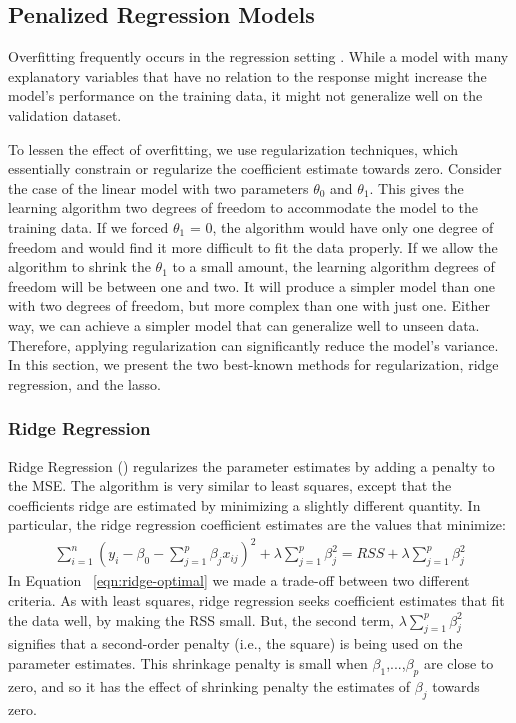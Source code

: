 \subsection{Penalized Regression Models}
\label{ssec:penalized_regression_models}

Overfitting frequently occurs in the regression setting
\parencite{harrell2015regression}.  While a model with many explanatory
variables that have no relation to the response might increase the model's
performance on the training data, it might not generalize well on the validation dataset.

To lessen the effect of overfitting, we use regularization techniques, which
essentially constrain or regularize the coefficient estimate towards zero.
Consider the case of the linear model with two parameters $\theta_0$ and
$\theta_1$. This gives the learning algorithm two degrees of freedom to
accommodate the model to the training data. If we forced $\theta_1$ = 0, the
algorithm would have only one degree of freedom and would find it more difficult
to fit the data properly. If we allow the algorithm to shrink the $\theta_1$  to
a small amount, the learning algorithm degrees of freedom will be between one
and two. It will produce a simpler model than one with two degrees of freedom,
but more complex than one with just one.  Either way, we can achieve a simpler
model that can generalize well to unseen data. Therefore, applying regularization can significantly reduce the model's variance.
In this section, we present the two best-known methods for regularization, ridge
regression, and the lasso.

\subsubsection*{Ridge Regression}

Ridge Regression (\textcite{hoerl1970ridge})  regularizes the parameter
estimates by adding a penalty to the MSE. The algorithm is very similar to least
squares, except that the coefficients ridge are estimated by minimizing a
slightly different quantity. In particular, the ridge regression coefficient
estimates  are the values that minimize:
\begin{eqnarray}
    \label{eqn:ridge-optimal}
    \sum_{i=1}^{n}(y_i -\beta_0 - \sum_{j=1}^{p}\beta_j x_{ij}) ^ 2 + \lambda
    \sum_{j=1}^{p}\beta_{j}^2 = RSS + \lambda \sum_{j=1}^{p}\beta_{j}^2
\end{eqnarray}
In  Equation  ~\ref{eqn:ridge-optimal} we made a trade-off between two different
criteria. As with least squares, ridge regression seeks coefficient estimates
that fit the data well, by making the RSS small. But, the second term, $\lambda
\sum_{j=1}^{p}\beta_{j}^2$ signifies that a second-order penalty (i.e., the
square) is being used on the parameter estimates.
This shrinkage penalty is small when $\beta_1$,...,$\beta_p$ are close to zero,
and so it has the effect of shrinking penalty the estimates of $\beta_j$ towards
zero.

